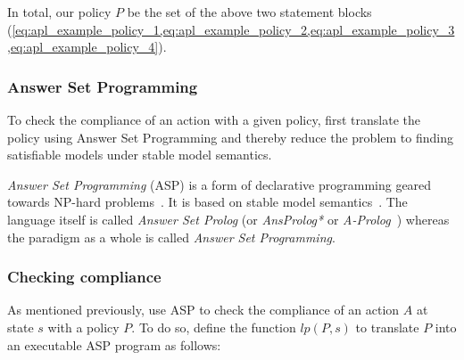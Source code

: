In total, our policy $P$ be the set of the above two statement blocks (\cref{eq:apl_example_policy_1,eq:apl_example_policy_2,eq:apl_example_policy_3,eq:apl_example_policy_4}).

\subsubsection{Answer Set Programming}
\label{subsubsec:asp}

To check the compliance of an action with a given policy, \citet{gelfond_authorization_2008} first translate the policy using Answer Set Programming and thereby reduce the problem to finding satisfiable models under stable model semantics.

\textit{Answer Set Programming} (ASP) is a form of declarative programming geared towards NP-hard problems~\citep{vladimir_lifschitz_what_2008}.
It is based on stable model semantics~\citep{gelfond_stable_1988}.
The language itself is called \textit{Answer Set Prolog} (or \textit{AnsProlog*} or \textit{A-Prolog}~\citep{baral_answer_2004}) whereas the paradigm as a whole is called \textit{Answer Set Programming}.

\subsubsection{Checking compliance}

As mentioned previously, \citet{gelfond_authorization_2008} use ASP to check the compliance of an action $A$ at state $s$ with a policy $P$.
To do so, \citet{gelfond_authorization_2008} define the function $lp(P,s)$ to translate $P$ into an executable ASP program as follows:

